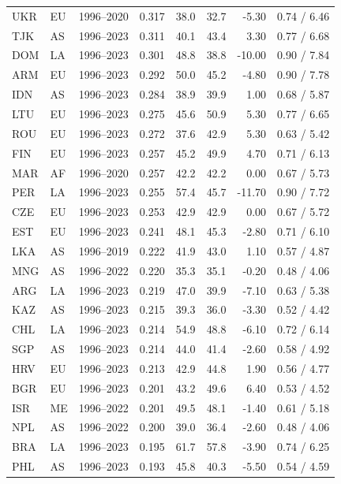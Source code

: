 \begin{table}[H]
\begin{threeparttable}
\begin{tabular}{llrrrrrr}
UKR & EU & 1996--2020 & 0.317 & 38.0 & 32.7 & -5.30 & 0.74 / 6.46 \\
TJK & AS & 1996--2023 & 0.311 & 40.1 & 43.4 & 3.30 & 0.77 / 6.68 \\
DOM & LA & 1996--2023 & 0.301 & 48.8 & 38.8 & -10.00 & 0.90 / 7.84 \\
ARM & EU & 1996--2023 & 0.292 & 50.0 & 45.2 & -4.80 & 0.90 / 7.78 \\
IDN & AS & 1996--2023 & 0.284 & 38.9 & 39.9 & 1.00 & 0.68 / 5.87 \\
LTU & EU & 1996--2023 & 0.275 & 45.6 & 50.9 & 5.30 & 0.77 / 6.65 \\
ROU & EU & 1996--2023 & 0.272 & 37.6 & 42.9 & 5.30 & 0.63 / 5.42 \\
FIN & EU & 1996--2023 & 0.257 & 45.2 & 49.9 & 4.70 & 0.71 / 6.13 \\
MAR & AF & 1996--2020 & 0.257 & 42.2 & 42.2 & 0.00 & 0.67 / 5.73 \\
PER & LA & 1996--2023 & 0.255 & 57.4 & 45.7 & -11.70 & 0.90 / 7.72 \\
CZE & EU & 1996--2023 & 0.253 & 42.9 & 42.9 & 0.00 & 0.67 / 5.72 \\
EST & EU & 1996--2023 & 0.241 & 48.1 & 45.3 & -2.80 & 0.71 / 6.10 \\
LKA & AS & 1996--2019 & 0.222 & 41.9 & 43.0 & 1.10 & 0.57 / 4.87 \\
MNG & AS & 1996--2022 & 0.220 & 35.3 & 35.1 & -0.20 & 0.48 / 4.06 \\
ARG & LA & 1996--2023 & 0.219 & 47.0 & 39.9 & -7.10 & 0.63 / 5.38 \\
KAZ & AS & 1996--2023 & 0.215 & 39.3 & 36.0 & -3.30 & 0.52 / 4.42 \\
CHL & LA & 1996--2023 & 0.214 & 54.9 & 48.8 & -6.10 & 0.72 / 6.14 \\
SGP & AS & 1996--2023 & 0.214 & 44.0 & 41.4 & -2.60 & 0.58 / 4.92 \\
HRV & EU & 1996--2023 & 0.213 & 42.9 & 44.8 & 1.90 & 0.56 / 4.77 \\
BGR & EU & 1996--2023 & 0.201 & 43.2 & 49.6 & 6.40 & 0.53 / 4.52 \\
ISR & ME & 1996--2022 & 0.201 & 49.5 & 48.1 & -1.40 & 0.61 / 5.18 \\
NPL & AS & 1996--2022 & 0.200 & 39.0 & 36.4 & -2.60 & 0.48 / 4.06 \\
BRA & LA & 1996--2023 & 0.195 & 61.7 & 57.8 & -3.90 & 0.74 / 6.25 \\
PHL & AS & 1996--2023 & 0.193 & 45.8 & 40.3 & -5.50 & 0.54 / 4.59 \\

\end{tabular}
\end{threeparttable}
\end{table}
